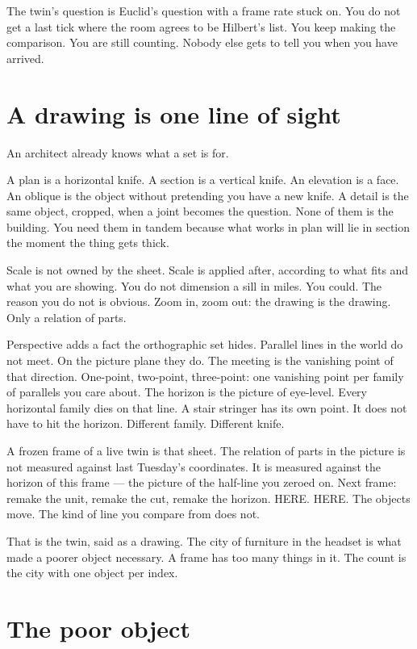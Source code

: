 \documentclass[11pt,a4paper]{article}
\begin{document}
The twin's question is Euclid's question with a frame rate stuck on.
You do not get a last tick where the room agrees to be Hilbert's list.
You keep making the comparison.
You are still counting.
Nobody else gets to tell you when you have arrived.

\section{A drawing is one line of sight}

An architect already knows what a set is for.

A plan is a horizontal knife.
A section is a vertical knife.
An elevation is a face.
An oblique is the object without pretending you have a new knife.
A detail is the same object, cropped, when a joint becomes the question.
None of them is the building.
You need them in tandem because what works in plan will lie in section the moment the thing gets thick.

Scale is not owned by the sheet.
Scale is applied after, according to what fits and what you are showing.
You do not dimension a sill in miles.
You could.
The reason you do not is obvious.
Zoom in, zoom out: the drawing is the drawing.
Only a relation of parts.

Perspective adds a fact the orthographic set hides.
Parallel lines in the world do not meet.
On the picture plane they do.
The meeting is the vanishing point of that direction.
One-point, two-point, three-point: one vanishing point per family of parallels you care about.
The horizon is the picture of eye-level.
Every horizontal family dies on that line.
A stair stringer has its own point.
It does not have to hit the horizon.
Different family.
Different knife.

A frozen frame of a live twin is that sheet.
The relation of parts in the picture is not measured against last Tuesday's coordinates.
It is measured against the horizon of this frame --- the picture of the half-line you zeroed on.
Next frame: remake the unit, remake the cut, remake the horizon.
HERE.
HERE.
The objects move.
The kind of line you compare from does not.

That is the twin, said as a drawing.
The city of furniture in the headset is what made a poorer object necessary.
A frame has too many things in it.
The count is the city with one object per index.

\section{The poor object}
\end{document}

